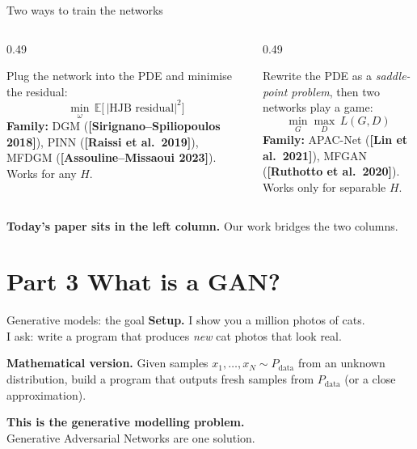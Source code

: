 \documentclass[10pt,aspectratio=169]{beamer}
\newcommand{\cmark}{\textcolor{kaustteal!80!black}{\ding{51}}}
\newcommand{\xmark}{\textcolor{accent}{\ding{55}}}
\newcommand{\E}{\mathbb{E}}
\newcommand{\teal}[1]{\textcolor{kaustteal}{#1}}
\newcommand{\citehl}[1]{\textcolor{kaustblue!80!black}{\textbf{[#1]}}}
\begin{document}
\begin{frame}{Two ways to train the networks}
\begin{columns}[T]
\begin{column}{0.49\textwidth}
\begin{tcolorbox}[colback=kaustblue!8, colframe=kaustblue,
                  title={\textbf{Physics-informed / PINN / DGM}},
                  fonttitle=\bfseries]
Plug the network into the PDE and minimise the residual:
\[
  \min_\omega \, \E\bigl[\,|\text{HJB residual}|^2\bigr]
\]
\textbf{Family:} DGM (\citehl{Sirignano--Spiliopoulos 2018}),
PINN (\citehl{Raissi et al.\ 2019}), MFDGM (\citehl{Assouline--Missaoui 2023}).
\smallskip\\
Works for \cmark\;any $H$.
\end{tcolorbox}
\end{column}
\begin{column}{0.49\textwidth}
\begin{tcolorbox}[colback=kaustteal!8, colframe=kaustteal,
                  title={\textbf{Variational / GAN-based}},
                  fonttitle=\bfseries]
Rewrite the PDE as a \emph{saddle-point problem}, then two networks
play a game:
\[
  \min_G \max_D \, L(G,D)
\]
\textbf{Family:} APAC-Net (\citehl{Lin et al.\ 2021}),
MFGAN (\citehl{Ruthotto et al.\ 2020}).
\smallskip\\
Works only for \xmark\;separable $H$.
\end{tcolorbox}
\end{column}
\end{columns}

\medskip
\begin{center}
\textbf{Today's paper sits in the left column.}
\teal{Our work bridges the two columns.}
\end{center}
\end{frame}

\section{Part 3 \;\textbar\; What is a GAN?}

\begin{frame}{Generative models: the goal}
\textbf{Setup.} I show you a million photos of cats.
\smallskip\\
I ask: write a program that produces \emph{new} cat photos that look real.

\medskip
\textbf{Mathematical version.} Given samples $x_1,\ldots,x_N \sim P_{\text{data}}$
from an unknown distribution, build a program that outputs fresh samples
from $P_{\text{data}}$ (or a close approximation).

\medskip
\textbf{This is the generative modelling problem.}\\[3pt]
\teal{Generative Adversarial Networks} are one solution.
\end{frame}
\end{document}
